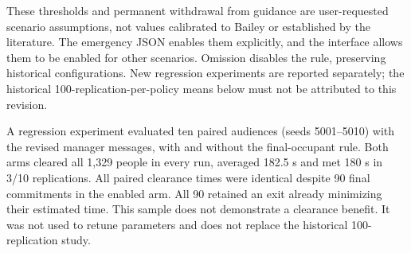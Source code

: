 These thresholds and permanent withdrawal from guidance are user-requested scenario assumptions, not values calibrated to Bailey or established by the literature. The emergency JSON enables them explicitly, and the interface allows them to be enabled for other scenarios. Omission disables the rule, preserving historical configurations. New regression experiments are reported separately; the historical 100-replication-per-policy means below must not be attributed to this revision.


A regression experiment evaluated ten paired audiences (seeds 5001--5010) with the revised manager messages, with and without the final-occupant rule. Both arms cleared all 1,329 people in every run, averaged 182.5 s and met 180 s in 3/10 replications. All paired clearance times were identical despite 90 final commitments in the enabled arm. All 90 retained an exit already minimizing their estimated time. This sample does not demonstrate a clearance benefit. It was not used to retune parameters and does not replace the historical 100-replication study.
